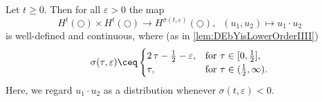 \begin{lemma}\label{lem:ProductRuleAsDistribution}
    Let $t \geq 0$. 
    Then for all $\varepsilon > 0$ the map
    \[
        H^{t}(\Circle) \times H^{t}(\Circle)
        \to 
        H^{\sigma(t,\varepsilon)}(\Circle),
        \;\;
        (u_1,u_2) \mapsto u_1 \cdot u_2
    \]
    is well-defined and continuous, where (as in \cref{lem:DEbYisLowerOrderIIII})
    \[
        \sigma(\tau,\varepsilon) \ceq 
        \begin{cases}
            2\,\tau - \frac{1}{2} - \varepsilon ,&\text{for $ \tau \in [0,\frac{1}{2}]$},\\
            \tau                                ,&\text{for $\tau \in(\frac{1}{2},\infty)$}.
        \end{cases}
    \]
    Here, we regard $ u_1\cdot u_2 $ as a distribution whenever $ \sigma(t,\varepsilon)<0 $.
\end{lemma}

